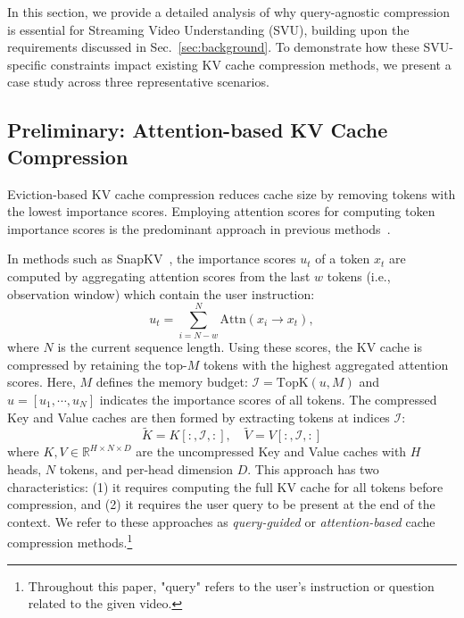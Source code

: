 In this section, we provide a detailed analysis of why query-agnostic compression is essential for Streaming Video Understanding (SVU), building upon the requirements discussed in Sec.~\ref{sec:background}. To demonstrate how these SVU-specific constraints impact existing KV cache compression methods, we present a case study across three representative scenarios.


\subsection{Preliminary: Attention-based KV Cache Compression}\label{appn:prelim}

Eviction-based KV cache compression reduces cache size by removing tokens with the lowest importance scores.
Employing attention scores for computing token importance scores is the predominant approach in previous methods~\cite{li2024snapkv,chen2024image,fu2024headkv,hooper2024squeezed}.

In methods such as SnapKV~\cite{li2024snapkv}, the importance scores $u_t$ of a token $x_t$ are computed by aggregating attention scores from the last $w$ tokens (i.e., observation window) which contain the user instruction:
\vspace{-.1in}
\begin{equation}
u_t = \sum_{i=N-w}^{N} \text{Attn}(x_{i} \rightarrow x_{t}),
\label{eq:importance-future}
\end{equation}
where $N$ is the current sequence length.
Using these scores, the KV cache is compressed by retaining the top-$M$ tokens with the highest aggregated attention scores.
Here, $M$ defines the memory budget: $\mathcal{I} = \text{TopK}(u, M)$ and $u = [u_1, \cdots, u_N]$ indicates the importance scores of all tokens.
The compressed Key and Value caches are then formed by extracting tokens at indices $\mathcal{I}$:
\begin{equation}
\tilde{K} = K[:, \mathcal{I}, :], \quad \tilde{V} = V[:, \mathcal{I}, :]
\label{eq:cache-compression}
\end{equation}
where $K, V \in \mathbb{R}^{H \times N \times D}$ are the uncompressed Key and Value caches with $H$ heads, $N$ tokens, and per-head dimension $D$. 
This approach has two characteristics: (1) it requires computing the full KV cache for all tokens before compression, and (2) it requires the user query to be present at the end of the context. We refer to these approaches as \textit{query-guided} or \textit{attention-based} cache compression methods.\footnote{Throughout this paper, "query" refers to the user's instruction or question related to the given video.}

